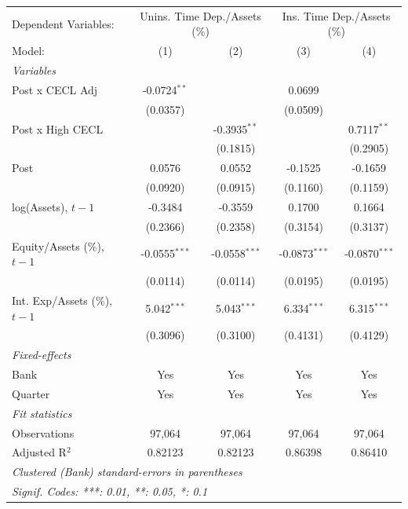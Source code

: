 
\begingroup
\centering
\begin{tabular}{lcccc}
   \tabularnewline \midrule \midrule
   Dependent Variables: & \multicolumn{2}{c}{Unins. Time Dep./Assets (\%)} & \multicolumn{2}{c}{Ins. Time Dep./Assets (\%)}\\
   Model:                         & (1)             & (2)             & (3)             & (4)\\  
   \midrule
   \emph{Variables}\\
   Post x CECL Adj                & -0.0724$^{**}$  &                 & 0.0699          &   \\   
                                  & (0.0357)        &                 & (0.0509)        &   \\   
   Post x High CECL               &                 & -0.3935$^{**}$  &                 & 0.7117$^{**}$\\   
                                  &                 & (0.1815)        &                 & (0.2905)\\   
   Post                           & 0.0576          & 0.0552          & -0.1525         & -0.1659\\   
                                  & (0.0920)        & (0.0915)        & (0.1160)        & (0.1159)\\   
   log(Assets), $t{-}1$           & -0.3484         & -0.3559         & 0.1700          & 0.1664\\   
                                  & (0.2366)        & (0.2358)        & (0.3154)        & (0.3137)\\   
   Equity/Assets (\%), $t{-}1$    & -0.0555$^{***}$ & -0.0558$^{***}$ & -0.0873$^{***}$ & -0.0870$^{***}$\\   
                                  & (0.0114)        & (0.0114)        & (0.0195)        & (0.0195)\\   
   Int. Exp/Assets (\%), $t{-}1$  & 5.042$^{***}$   & 5.043$^{***}$   & 6.334$^{***}$   & 6.315$^{***}$\\   
                                  & (0.3096)        & (0.3100)        & (0.4131)        & (0.4129)\\   
   \midrule
   \emph{Fixed-effects}\\
   Bank                           & Yes             & Yes             & Yes             & Yes\\  
   Quarter                        & Yes             & Yes             & Yes             & Yes\\  
   \midrule
   \emph{Fit statistics}\\
   Observations                   & 97,064          & 97,064          & 97,064          & 97,064\\  
   Adjusted R$^2$                 & 0.82123         & 0.82123         & 0.86398         & 0.86410\\  
   \midrule \midrule
   \multicolumn{5}{l}{\emph{Clustered (Bank) standard-errors in parentheses}}\\
   \multicolumn{5}{l}{\emph{Signif. Codes: ***: 0.01, **: 0.05, *: 0.1}}\\
\end{tabular}
\par\endgroup


